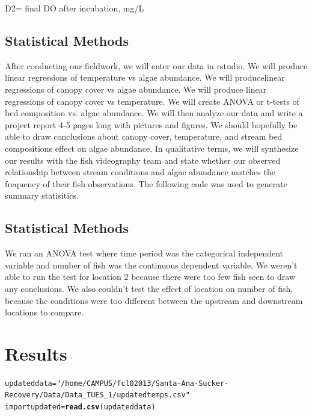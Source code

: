 \documentclass{article}\usepackage[]{graphicx}\usepackage[]{color}
\makeatletter
\newcommand{\hlstr}[1]{\textcolor[rgb]{0.192,0.494,0.8}{#1}}%
\newcommand{\hlstd}[1]{\textcolor[rgb]{0.345,0.345,0.345}{#1}}%
\newcommand{\hlkwb}[1]{\textcolor[rgb]{0.69,0.353,0.396}{#1}}%
\newcommand{\hlkwd}[1]{\textcolor[rgb]{0.737,0.353,0.396}{\textbf{#1}}}%
\newenvironment{kframe}{%
 \def\at@end@of@kframe{}%
 \ifinner\ifhmode%
  \def\at@end@of@kframe{\end{minipage}}%
  \begin{minipage}{\columnwidth}%
 \fi\fi%
 \def\FrameCommand##1{\hskip\@totalleftmargin \hskip-\fboxsep
 \colorbox{shadecolor}{##1}\hskip-\fboxsep
     \hskip-\linewidth \hskip-\@totalleftmargin \hskip\columnwidth}%
 \MakeFramed {\advance\hsize-\width
   \@totalleftmargin\z@ \linewidth\hsize
   \@setminipage}}%
 {\par\unskip\endMakeFramed%
 \at@end@of@kframe}
\newenvironment{knitrout}{}{} %
\makeatother
\begin{document}
D2= final DO after incubation, mg/L


\subsection{Statistical Methods}

After conducting our ﬁeldwork, we will enter our data in rstudio. We will produce linear regressions of temperature vs algae abundance. We will producelinear regressions of canopy cover vs algae abundance. We will produce linear regressions of canopy cover vs temperature. We will create ANOVA or t-tests of bed composition vs. algae abundance. We will then analyze our data and write a project report 4-5 pages long with pictures and ﬁgures. We should hopefully be able to draw conclusions about canopy cover, temperature, and stream bed compositions eﬀect on algae abundance. In qualitative terms, we will synthesize our results with the ﬁsh videography team and state whether our observed relationship between stream conditions and algae abundance matches the frequency of their ﬁsh observations.
The following code was used to generate summary statisitics. 


\subsection{Statistical Methods}

We ran an ANOVA test where time period was the categorical independent variable and number of fish was the continuous dependent variable.  We weren’t able to run the test for location 2 because there were too few fish seen to draw any conclusions.  We also couldn’t test the effect of location on number of fish, because the conditions were too different between the upstream and downstream locations to compare.

\section{Results}

\begin{knitrout}
\color{fgcolor}\begin{kframe}
\begin{alltt}
\hlstd{updateddata}\hlkwb{=} \hlstr{"/home/CAMPUS/fcl02013/Santa-Ana-Sucker-Recovery/Data/Data_TUES_1/updatedtemps.csv"}
\hlstd{importupdated}\hlkwb{=}\hlkwd{read.csv}\hlstd{(updateddata)}
\end{alltt}
\end{kframe}
\end{knitrout}
\end{document}
